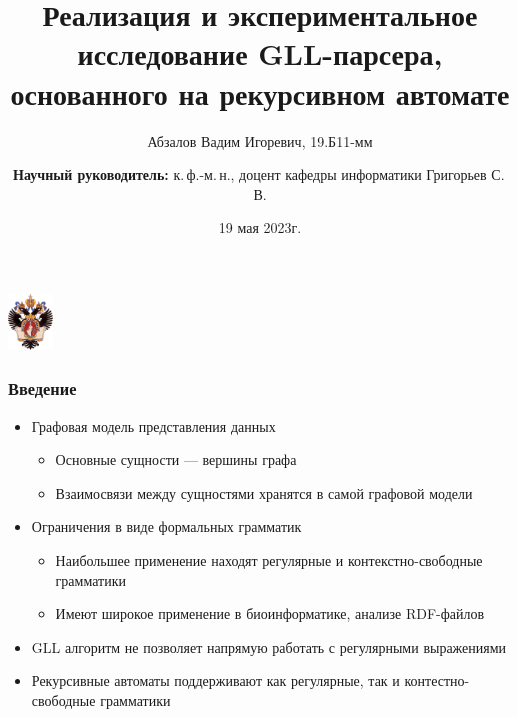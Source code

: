 \documentclass[aspectratio=169]{beamer}
\title[]{Реализация и экспериментальное исследование GLL-парсера, основанного на рекурсивном автомате}
\institute[СПбГУ]{
Санкт-Петербургский государственный университет \\
Кафедра системного программирования }
\author[Абзалов Вадим]{Абзалов Вадим Игоревич, 19.Б11-мм \\
  \and  
    {\bfseries Научный руководитель:} к.\,ф.-м.\,н., доцент кафедры информатики Григорьев С.\,В. \\ 
}
\date{19 мая 2023г.}
\begin{document}
{
\begin{frame}
  \begin{center}
  {\includegraphics[width=1.2cm]{pictures/SPbGU_Logo.png}}
  \end{center}
  \titlepage
\end{frame}
}

\begin{frame}[fragile]
  \transwipe[direction=90]
  \frametitle{Введение}
  \begin{itemize}
      \item Графовая модель представления данных
      \begin{itemize}
        \item Основные сущности --- вершины графа
        \item Взаимосвязи между сущностями хранятся в самой графовой модели
      \end{itemize}
\item Ограничения в виде формальных грамматик
\begin{itemize}
    \item Наибольшее применение находят регулярные и контекстно-свободные грамматики
    \item Имеют широкое применение в биоинформатике, анализе RDF-файлов
\end{itemize}
\item GLL алгоритм не позволяет напрямую работать с регулярными выражениями
\item Рекурсивные автоматы поддерживают как регулярные, так и контестно-свободные грамматики
\end{itemize}
\end{frame}
\end{document}
